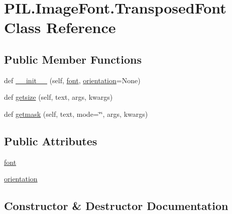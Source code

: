 \hypertarget{classPIL_1_1ImageFont_1_1TransposedFont}{}\section{P\+I\+L.\+Image\+Font.\+Transposed\+Font Class Reference}
\label{classPIL_1_1ImageFont_1_1TransposedFont}
\subsection*{Public Member Functions}
\begin{DoxyCompactItemize}
\item 
def \hyperlink{classPIL_1_1ImageFont_1_1TransposedFont_a7ad081f9096b9cb922e74e8e1d302a1d}{\+\_\+\+\_\+init\+\_\+\+\_\+} (self, \hyperlink{classPIL_1_1ImageFont_1_1TransposedFont_a40fcc6a7b532226623c12370a13739b4}{font}, \hyperlink{classPIL_1_1ImageFont_1_1TransposedFont_ad5f426994baea0e336fabd78a048a6f3}{orientation}=None)
\item 
def \hyperlink{classPIL_1_1ImageFont_1_1TransposedFont_ac664b734cc8b244b3fb2dea9b8291ef9}{getsize} (self, text, args, kwargs)
\item 
def \hyperlink{classPIL_1_1ImageFont_1_1TransposedFont_a9e03dec76f549c7f4aeb49977ae75ffd}{getmask} (self, text, mode=\char`\"{}\char`\"{}, args, kwargs)
\end{DoxyCompactItemize}
\subsection*{Public Attributes}
\begin{DoxyCompactItemize}
\item 
\hyperlink{classPIL_1_1ImageFont_1_1TransposedFont_a40fcc6a7b532226623c12370a13739b4}{font}
\item 
\hyperlink{classPIL_1_1ImageFont_1_1TransposedFont_ad5f426994baea0e336fabd78a048a6f3}{orientation}
\end{DoxyCompactItemize}


\subsection{Constructor \& Destructor Documentation}
\mbox{\label{classPIL_1_1ImageFont_1_1TransposedFont_a7ad081f9096b9cb922e74e8e1d302a1d}} 
